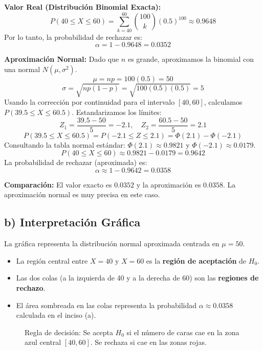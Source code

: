 \documentclass[12pt]{article}
\begin{document}
\textbf{Valor Real (Distribución Binomial Exacta):}
$$ P(40 \le X \le 60) = \sum_{k=40}^{60} \binom{100}{k} (0.5)^{100} \approx 0.9648 $$
Por lo tanto, la probabilidad de rechazar es:
$$ \alpha = 1 - 0.9648 = 0.0352 $$

\textbf{Aproximación Normal:}
Dado que $n$ es grande, aproximamos la binomial con una normal $N(\mu, \sigma^2)$.
$$ \mu = np = 100(0.5) = 50 $$
$$ \sigma = \sqrt{np(1-p)} = \sqrt{100(0.5)(0.5)} = 5 $$
Usando la corrección por continuidad para el intervalo $[40, 60]$, calculamos $P(39.5 \le X \le 60.5)$.
Estandarizamos los límites:
$$ Z_1 = \frac{39.5 - 50}{5} = -2.1, \quad Z_2 = \frac{60.5 - 50}{5} = 2.1 $$
$$ P(39.5 \le X \le 60.5) = P(-2.1 \le Z \le 2.1) = \Phi(2.1) - \Phi(-2.1) $$
Consultando la tabla normal estándar: $\Phi(2.1) \approx 0.9821$ y $\Phi(-2.1) \approx 0.0179$.
$$ P(40 \le X \le 60) \approx 0.9821 - 0.0179 = 0.9642 $$
La probabilidad de rechazar (aproximada) es:
$$ \alpha \approx 1 - 0.9642 = 0.0358 $$

\textbf{Comparación:} El valor exacto es $0.0352$ y la aproximación es $0.0358$. La aproximación normal es muy precisa en este caso.

\subsection*{b) Interpretación Gráfica}
La gráfica representa la distribución normal aproximada centrada en $\mu=50$.
\begin{itemize}
    \item La región central entre $X=40$ y $X=60$ es la \textbf{región de aceptación} de $H_0$.
    \item Las dos colas (a la izquierda de 40 y a la derecha de 60) son las \textbf{regiones de rechazo}.
    \item El área sombreada en las colas representa la probabilidad $\alpha \approx 0.0358$ calculada en el inciso (a).
\end{itemize}

\begin{figure}[H]
\centering
{}
\caption{Regla de decisión: Se acepta $H_0$ si el número de caras cae en la zona azul central $[40, 60]$. Se rechaza si cae en las zonas rojas.}
\end{figure}
\end{document}

